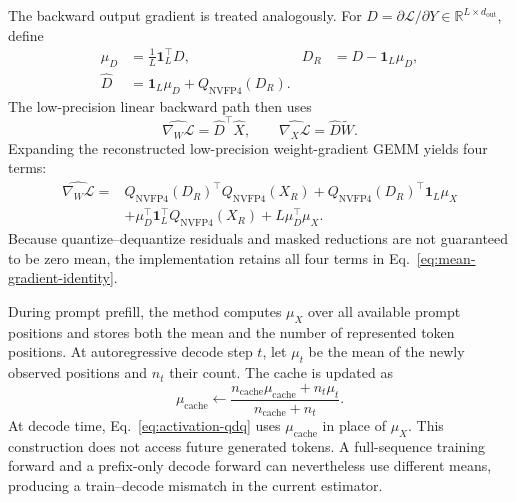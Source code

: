 \documentclass[letterpaper]{article}
\begin{document}
The backward output gradient is treated analogously. For $D=\partial\mathcal{L}/\partial Y\in\mathbb{R}^{L\times d_{\mathrm{out}}}$, define
\begin{equation}
    \begin{aligned}
        \mu_D&=\frac{1}{L}\mathbf{1}_L^{\top}D,
        &D_R&=D-\mathbf{1}_L\mu_D,\\[-0.2ex]
        \widehat D&=\mathbf{1}_L\mu_D+Q_{\mathrm{NVFP4}}(D_R).
    \end{aligned}
    \label{eq:gradient-qdq}
\end{equation}
The low-precision linear backward path then uses
\begin{equation}
    \widehat{\nabla_W\mathcal{L}}=\widehat D^{\top}\widehat X,
    \qquad
    \widehat{\nabla_X\mathcal{L}}=\widehat D\widetilde W.
    \label{eq:quantized-backward}
\end{equation}
Expanding the reconstructed low-precision weight-gradient GEMM yields four terms:
\begin{equation}
    \begin{aligned}
    \widehat{\nabla_W\mathcal{L}}
    ={}& Q_{\mathrm{NVFP4}}(D_R)^{\top}Q_{\mathrm{NVFP4}}(X_R)
    + Q_{\mathrm{NVFP4}}(D_R)^{\top}\mathbf{1}_L\mu_X \\[-0.2ex]
    &+ \mu_D^{\top}\mathbf{1}_L^{\top}Q_{\mathrm{NVFP4}}(X_R)
    + L\mu_D^{\top}\mu_X.
    \end{aligned}
    \label{eq:mean-gradient-identity}
\end{equation}
Because quantize--dequantize residuals and masked reductions are not guaranteed to be zero mean, the implementation retains all four terms in Eq.~\ref{eq:mean-gradient-identity}.

During prompt prefill, the method computes $\mu_X$ over all available prompt positions and stores both the mean and the number of represented token positions. At autoregressive decode step $t$, let $\mu_t$ be the mean of the newly observed positions and $n_t$ their count. The cache is updated as
\begin{equation}
    \mu_{\mathrm{cache}} \leftarrow
    \frac{n_{\mathrm{cache}}\mu_{\mathrm{cache}}+n_t\mu_t}
    {n_{\mathrm{cache}}+n_t}.
    \label{eq:causal-mean-cache}
\end{equation}
At decode time, Eq.~\ref{eq:activation-qdq} uses $\mu_{\mathrm{cache}}$ in place of $\mu_X$. This construction does not access future generated tokens. A full-sequence training forward and a prefix-only decode forward can nevertheless use different means, producing a train--decode mismatch in the current estimator.
\end{document}
